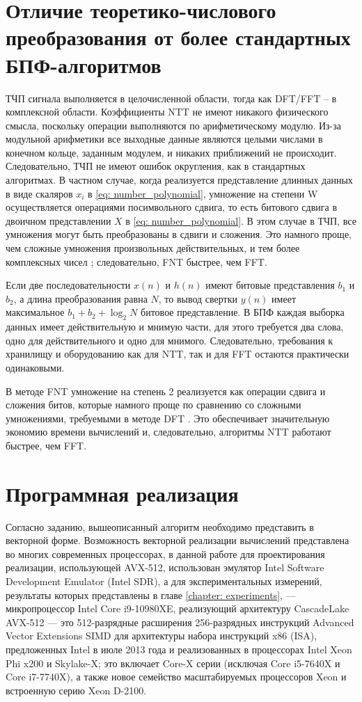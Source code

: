 \section{Отличие теоретико-числового преобразования от более стандартных БПФ-алгоритмов}
ТЧП сигнала выполняется в целочисленной области, тогда как DFT/FFT – в комплексной области.
Коэффициенты NTT не имеют никакого физического смысла, поскольку операции выполняются по арифметическому модулю.
Из-за модульной арифметики все выходные данные являются целыми числами в конечном кольце, заданным модулем, и никаких приближений не происходит.
Следовательно, ТЧП не имеют ошибок округления, как в стандартных алгоритмах.
В частном случае, когда реализуется представление длинных данных в виде скаляров $x_i$ в \eqref{eq: number_polynomial}, умножение на степени W осуществляется операциями посимвольного сдвига, то есть битового сдвига в двоичном представлении $X$ в \eqref{eq: number_polynomial}.
В этом случае в ТЧП, все умножения могут быть преобразованы в сдвиги и сложения.
Это намного проще, чем сложные умножения произвольных действительных, и тем более комплексных чисел \cite{fast-multiplication-long-ints}; следовательно, FNT быстрее, чем FFT.

Если две последовательности $x(n)$ и $h(n)$ имеют битовые представления $b_1$ и $b_2$, а длина преобразования равна $N$, то вывод свертки $y(n)$ имеет максимальное $b_1+b_2+\log_2 ⁡N$ битовое представление.
В БПФ каждая выборка данных имеет действительную и мнимую части, для этого требуется два слова, одно для действительного и одно для мнимого.
Следовательно, требования к хранилищу и оборудованию как для NTT, так и для FFT остаются практически одинаковыми.

В методе FNT умножение на степень 2 реализуется как операции сдвига и сложения битов, которые намного проще по сравнению со сложными умножениями, требуемыми в методе DFT \cite{RingLWE-multiplication}.
Это обеспечивает значительную экономию времени вычислений и, следовательно, алгоритмы NTT работают быстрее, чем FFT.

\section{Программная реализация}
Согласно заданию, вышеописанный алгоритм необходимо представить в векторной форме.
Возможность векторной реализации вычислений представлена во многих современных процессорах, в данной работе для проектирования реализации, использующей AVX-512, использован эмулятор Intel\textregistered{} Software Development Emulator (Intel SDR), а для экспериментальных измерений, результаты которых представлены в главе \ref{chapter: experiments}, --– микропроцессор Intel Core i9-10980XE, реализующий архитектуру CascadeLake AVX-512 –-- это 512-разрядные расширения 256-разрядных инструкций Advanced Vector Extensions SIMD для архитектуры набора инструкций x86 (ISA), предложенных Intel в июле 2013 года и реализованных в процессорах Intel Xeon Phi x200 и Skylake-X; это включает Core-X серии (исключая Core i5-7640X и Core i7-7740X), а также новое семейство масштабируемых процессоров Xeon и встроенную серию Xeon D-2100.

